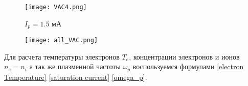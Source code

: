     \begin{figure}
        \centering
        \texttt{[image: VAC4.png]}
        \caption{$I_p = 1.5$ мА}
    \end{figure}

    \begin{figure}
        \centering
        \texttt{[image: all\_VAC.png]}
    \end{figure}

    Для расчета температуры электронов $T_e$, концентрации электронов и ионов
    $n_e = n_i$ а так же плазменной частоты $\omega_p$ воспользуемся формулами 
    \eqref{electron Temperature} \eqref{saturation current} \eqref{omega_p}. 

    

